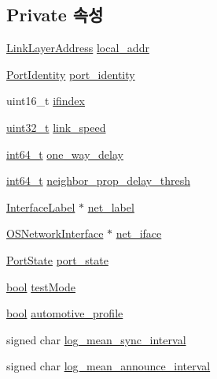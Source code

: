 \subsection*{Private 속성}
\begin{DoxyCompactItemize}
\item 
\hyperlink{class_link_layer_address}{Link\+Layer\+Address} \hyperlink{class_common_port_af3d1546f688fbb9cec0317d152cab1da}{local\+\_\+addr}
\item 
\hyperlink{class_port_identity}{Port\+Identity} \hyperlink{class_common_port_a928a9e09d06b348120139e5cd2fcbcfe}{port\+\_\+identity}
\item 
uint16\+\_\+t \hyperlink{class_common_port_af9eddbea0d06b00afe0a66dbe5371422}{ifindex}
\item 
\hyperlink{parse_8c_a6eb1e68cc391dd753bc8ce896dbb8315}{uint32\+\_\+t} \hyperlink{class_common_port_aae24fc4f200e75aa8215f797b2561dbf}{link\+\_\+speed}
\item 
\hyperlink{parse_8c_a67a9885ef4908cb72ce26d75b694386c}{int64\+\_\+t} \hyperlink{class_common_port_ac6f52fcdc0bbe5e322f5435e494bb827}{one\+\_\+way\+\_\+delay}
\item 
\hyperlink{parse_8c_a67a9885ef4908cb72ce26d75b694386c}{int64\+\_\+t} \hyperlink{class_common_port_ae6ecdaaf6ed26528bbb672556516bde4}{neighbor\+\_\+prop\+\_\+delay\+\_\+thresh}
\item 
\hyperlink{class_interface_label}{Interface\+Label} $\ast$ \hyperlink{class_common_port_a5885d7a835513edd0bbb0a170b4c9f01}{net\+\_\+label}
\item 
\hyperlink{class_o_s_network_interface}{O\+S\+Network\+Interface} $\ast$ \hyperlink{class_common_port_a7bc95d8cb3e95a8e7f9c5dc261289e37}{net\+\_\+iface}
\item 
\hyperlink{ptptypes_8hpp_a679431f1afc75d7bb9e972c022e53672}{Port\+State} \hyperlink{class_common_port_ae66554126902ed959a3b296ddd3204e8}{port\+\_\+state}
\item 
\hyperlink{avb__gptp_8h_af6a258d8f3ee5206d682d799316314b1}{bool} \hyperlink{class_common_port_a4ca1649b0fc050ca483e5dd8996ac80d}{test\+Mode}
\item 
\hyperlink{avb__gptp_8h_af6a258d8f3ee5206d682d799316314b1}{bool} \hyperlink{class_common_port_a915ce34888736844c056a811c96a9e9f}{automotive\+\_\+profile}
\item 
signed char \hyperlink{class_common_port_ae72fee092f86e98847d8872b9fc5c1d5}{log\+\_\+mean\+\_\+sync\+\_\+interval}
\item 
signed char \hyperlink{class_common_port_a0a7e8ccfc7b9e1ee20c3e3f5ab15ed86}{log\+\_\+mean\+\_\+announce\+\_\+interval}

\end{DoxyCompactItemize}
